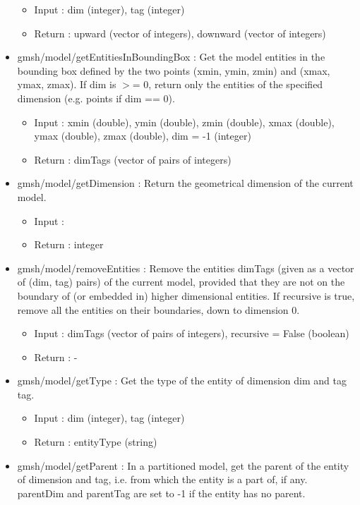 \documentclass[dvipdfmx, 9pt, a4paper]{article}
\numberwithin{equation}{section}
\begin{document}
\begin{itemize}
\begin{itemize}
\item Input : dim (integer), tag (integer)
\item Return : upward (vector of integers), downward (vector of integers)
\end{itemize}
\item gmsh/model/getEntitiesInBoundingBox : Get the model entities in the bounding box defined by the two points (xmin, ymin, zmin) and (xmax, ymax, zmax). If dim is $>$= 0, return only the entities of the specified dimension (e.g. points if dim == 0).
\begin{itemize}
\item Input : xmin (double), ymin (double), zmin (double), xmax (double), ymax (double), zmax (double), dim = -1 (integer)
\item Return : dimTags (vector of pairs of integers)
\end{itemize}
\item gmsh/model/getDimension : Return the geometrical dimension of the current model.
\begin{itemize}
\item Input : 
\item Return : integer
\end{itemize}
\item gmsh/model/removeEntities : Remove the entities dimTags (given as a vector of (dim, tag) pairs) of the current model, provided that they are not on the boundary of (or embedded in) higher dimensional entities. If recursive is true, remove all the entities on their boundaries, down to dimension 0.
\begin{itemize}
\item Input : dimTags (vector of pairs of integers), recursive = False (boolean)
\item Return : -
\end{itemize}
\item gmsh/model/getType : Get the type of the entity of dimension dim and tag tag.
\begin{itemize}
\item Input : dim (integer), tag (integer)
\item Return : entityType (string)
\end{itemize}
\item gmsh/model/getParent : In a partitioned model, get the parent of the entity of dimension and tag, i.e. from which the entity is a part of, if any. parentDim and parentTag are set to -1 if the entity has no parent.

\end{itemize}
\end{document}
